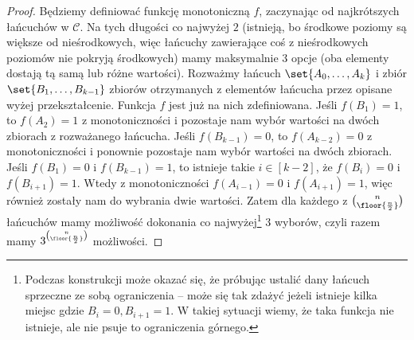 \begin{proof}
	Będziemy definiować funkcję monotoniczną $f$, zaczynając od najkrótszych
	łańcuchów w $\mathcal C$. Na tych długości co najwyżej $2$ (istnieją, bo
	środkowe poziomy są większe od nieśrodkowych, więc łańcuchy zawierające coś z
	nieśrodkowych poziomów nie pokryją środkowych) mamy maksymalnie $3$ opcje
	(oba elementy dostają tą samą lub różne wartości). Rozważmy łańcuch
	$\set{A_0,\ldots, A_k}$ i zbiór $\set{B_1,\ldots,B_{k-1}}$ zbiorów
	otrzymanych z elementów łańcucha przez opisane wyżej przekształcenie. Funkcja
	$f$ jest już na nich zdefiniowana. Jeśli $f(B_1)=1$, to $f(A_2)=1$ z
	monotoniczności i pozostaje nam wybór wartości na dwóch zbiorach z
	rozważanego łańcucha. Jeśli $f(B_{k-1})=0$, to $f(A_{k-2})=0$ z
	monotoniczności i ponownie pozostaje nam wybór wartości na dwóch zbiorach.
	Jeśli $f(B_1)=0$ i $f(B_{k-1})=1$, to istnieje takie $i\in [k-2]$, że
	$f(B_i)=0$ i $f(B_{i+1})=1$. Wtedy z monotoniczności $f(A_{i-1})=0$ i
	$f(A_{i+1})=1$, więc również zostały nam do wybrania dwie wartości. Zatem dla
	każdego z $\binom{n}{\floor{\frac n2}}$ łańcuchów mamy możliwość dokonania co
	najwyżej\footnote{Podczas konstrukcji może okazać się, że próbując ustalić dany łańcuch
		sprzeczne ze sobą ograniczenia -- może się tak zdażyć jeżeli istnieje kilka miejsc gdzie $B_i = 0, B_{i+1} = 1$.
		W takiej sytuacji wiemy, że taka funkcja nie istnieje, ale nie psuje to ograniczenia górnego.} $3$ wyborów, czyli razem mamy $3^{\binom{n}{\floor{\frac n2}}}$ możliwości.
\end{proof}


